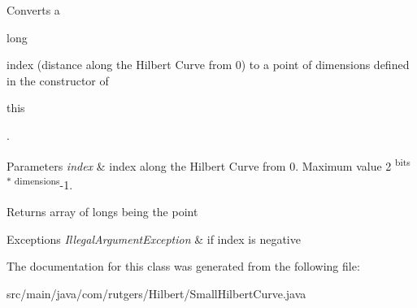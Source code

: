 Converts a
\begin{DoxyCode}
\textcolor{keywordtype}{long} 
\end{DoxyCode}
 index (distance along the Hilbert Curve from 0) to a point of dimensions defined in the constructor of
\begin{DoxyCode}
\textcolor{keyword}{this} 
\end{DoxyCode}
 .


\begin{DoxyParams}{Parameters}
{\em index} & index along the Hilbert Curve from 0. Maximum value 2 \textsuperscript{bits $\ast$ dimensions}-\/1. \\
\hline
\end{DoxyParams}
\begin{DoxyReturn}{Returns}
array of longs being the point 
\end{DoxyReturn}

\begin{DoxyExceptions}{Exceptions}
{\em Illegal\+Argument\+Exception} & if index is negative \\
\hline
\end{DoxyExceptions}


The documentation for this class was generated from the following file\+:\begin{DoxyCompactItemize}
\item 
src/main/java/com/rutgers/\+Hilbert/Small\+Hilbert\+Curve.\+java\end{DoxyCompactItemize}
